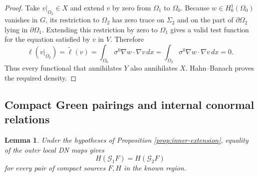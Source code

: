 \documentclass[11pt,oneside]{article}
\newtheorem{lemma}[theorem]{Lemma}
\begin{document}
\begin{proof}
Take \(v|_{\Omega_2}\in X\) and extend \(v\) by zero from \(\Omega_1\) to
\(\Omega_0\).  Because \(w\in H^1_0(\Omega_0)\) vanishes in \(G\), its
restriction to \(\Omega_2\) has zero trace on \(\Sigma_2\) and on the part of
\(\partial\Omega_2\) lying in \(\partial\Omega_1\).  Extending this restriction
by zero to \(\Omega_1\) gives a valid test function for the equation satisfied
by \(v\) in \(V\).  Therefore
\begin{equation}
  \ell(v|_{\Omega_2})
  =\widetilde\ell(v)
  =\int_{\Omega_0}\sigma^0\nabla w\cdot\nabla v\,dx
  =\int_{\Omega_2}\sigma^0\nabla w\cdot\nabla v\,dx
  =0.
\end{equation}
Thus every functional that annihilates \(Y\) also annihilates \(X\).
Hahn--Banach proves the required density.
\end{proof}

\subsection{Compact Green pairings and internal conormal relations}

\begin{lemma}
\label{lem:compact-green-pairings}
Under the hypotheses of Proposition \ref{prop:inner-extension}, equality of the
outer local DN maps gives
\begin{equation}
  H(\mathcal G_1F)=H(\mathcal G_2F)
  \label{eq:compact-green-pairings}
\end{equation}
for every pair of compact sources \(F,H\) in the known region.
\end{lemma}
\end{document}
